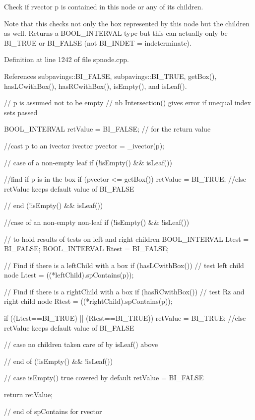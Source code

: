 \-Check if rvector p is contained in this node or any of its children. 

\-Note that this checks not only the box represented by this node but the children as well. \-Returns a \-B\-O\-O\-L\-\_\-\-I\-N\-T\-E\-R\-V\-A\-L type but this can actually only be \-B\-I\-\_\-\-T\-R\-U\-E or \-B\-I\-\_\-\-F\-A\-L\-S\-E (not \-B\-I\-\_\-\-I\-N\-D\-E\-T = indeterminate). 

\-Definition at line 1242 of file spnode.\-cpp.



\-References subpavings\-::\-B\-I\-\_\-\-F\-A\-L\-S\-E, subpavings\-::\-B\-I\-\_\-\-T\-R\-U\-E, get\-Box(), has\-L\-Cwith\-Box(), has\-R\-Cwith\-Box(), is\-Empty(), and is\-Leaf().


\begin{DoxyCode}
    {
        // p is assumed not to be empty
        // nb Intersection() gives error if unequal index sets passed

        BOOL_INTERVAL retValue = BI_FALSE; // for the return value

        //cast p to an ivector
        ivector pvector = _ivector(p);

        // case of a non-empty leaf
        if (!isEmpty() && isLeaf()) {


            //find if p is in the box
            if (pvector <= getBox()) {
                retValue = BI_TRUE;
            }
            //else retValue keeps default value of BI_FALSE


        } // end (!isEmpty() && isLeaf())

        //case of an non-empty non-leaf
        if (!isEmpty() && !isLeaf()) {

            // to hold results of tests on left and right children
            BOOL_INTERVAL Ltest = BI_FALSE;
            BOOL_INTERVAL Rtest = BI_FALSE;

            // Find if there is a leftChild with a box
            if (hasLCwithBox()) {
                // test left child node
                Ltest = ((*leftChild).spContains(p));
            }


            // Find if there is a rightChild with a box
            if (hasRCwithBox()) {
                // test Rz and right child node
                Rtest = ((*rightChild).spContains(p));
            }

            if ((Ltest==BI_TRUE) || (Rtest==BI_TRUE)) {
                retValue = BI_TRUE;
            }
            //else retValue keeps default value of BI_FALSE

            // case no children taken care of by isLeaf() above

        } // end of (!isEmpty() && !isLeaf())

        // case isEmpty() true covered by default retValue = BI_FALSE

        return retValue;

    } // end of spContains for rvector
\end{DoxyCode}
